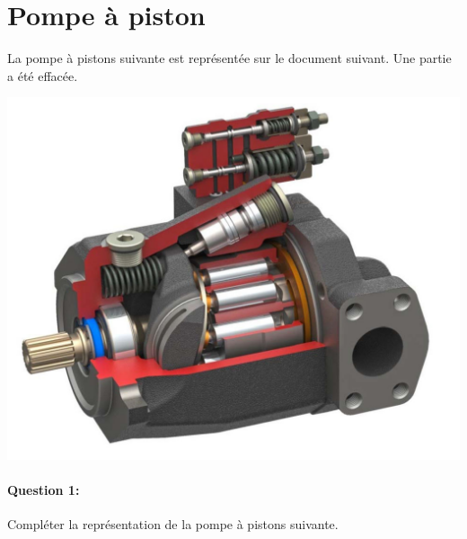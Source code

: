 

\section{Pompe à piston}

\begin{minipage}{0.45\linewidth}
La pompe à pistons suivante est représentée sur le document suivant. Une partie a été effacée.
\end{minipage} \hfill
\begin{minipage}{0.45\linewidth}
\includegraphics[width=0.8\linewidth]{img/pompe_piston}
\end{minipage}

\paragraph{Question 1:} Compléter la représentation de la pompe à pistons suivante.

\newpage




